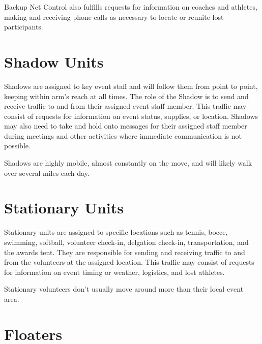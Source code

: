 \documentclass[pdflatex,letterpaper,twoside,12pt]{book}
\begin{document}
Backup Net Control also fulfills requests for information on coaches and athletes, making and receiving phone calls as necessary to locate or reunite lost participants.


\section{Shadow Units}

Shadows are assigned to key event staff and will follow them from point to point, keeping within arm's reach at all times.  The role of the Shadow is to send and receive traffic to and from their assigned event staff member.  This traffic may consist of requests for information on event status, supplies, or location.  Shadows may also need to take and hold onto messages for their assigned staff member during meetings and other activities where immediate communication is not possible.

Shadows are highly mobile, almost constantly on the move, and will likely walk over several miles each day.


\section{Stationary Units}

Stationary units are assigned to specific locations such as tennis, bocce, swimming, softball, volunteer check-in, delgation check-in, transportation, and the awards tent.  They are responsible for sending and receiving traffic to and from the volunteers at the assigned location.  This traffic may consist of requests for information on event timing or weather, logistics, and lost athletes. 

Stationary volunteers don't usually move around more than their local event area. 


\section{Floaters}
\end{document}

